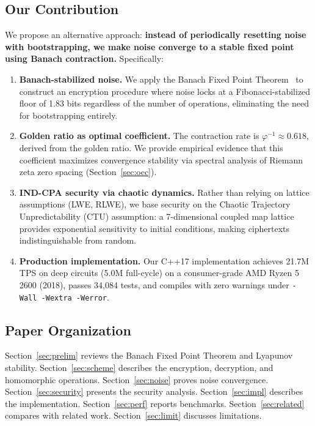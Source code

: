 \documentclass[11pt,a4paper]{article}
\begin{document}
\subsection{Our Contribution}

We propose an alternative approach: \textbf{instead of periodically resetting noise with bootstrapping, we make noise converge to a stable fixed point using Banach contraction.} Specifically:

\begin{enumerate}
    \item \textbf{Banach-stabilized noise.} We apply the Banach Fixed Point Theorem~\cite{banach1922} to construct an encryption procedure where noise locks at a Fibonacci-stabilized floor of 1.83 bits regardless of the number of operations, eliminating the need for bootstrapping entirely.
    
    \item \textbf{Golden ratio as optimal coefficient.} The contraction rate is $\varphi^{-1} \approx 0.618$, derived from the golden ratio. We provide empirical evidence that this coefficient maximizes convergence stability via spectral analysis of Riemann zeta zero spacing (Section~\ref{sec:occ}).
    
    \item \textbf{IND-CPA security via chaotic dynamics.} Rather than relying on lattice assumptions (LWE, RLWE), we base security on the Chaotic Trajectory Unpredictability (CTU) assumption: a 7-dimensional coupled map lattice provides exponential sensitivity to initial conditions, making ciphertexts indistinguishable from random.
    
    \item \textbf{Production implementation.} Our C++17 implementation achieves 21.7M TPS on deep circuits (5.0M full-cycle) on a consumer-grade AMD Ryzen 5 2600 (2018), passes 34,084 tests, and compiles with zero warnings under \texttt{-Wall -Wextra -Werror}.
\end{enumerate}

\subsection{Paper Organization}

Section~\ref{sec:prelim} reviews the Banach Fixed Point Theorem and Lyapunov stability. Section~\ref{sec:scheme} describes the encryption, decryption, and homomorphic operations. Section~\ref{sec:noise} proves noise convergence. Section~\ref{sec:security} presents the security analysis. Section~\ref{sec:impl} describes the implementation. Section~\ref{sec:perf} reports benchmarks. Section~\ref{sec:related} compares with related work. Section~\ref{sec:limit} discusses limitations.
\end{document}
